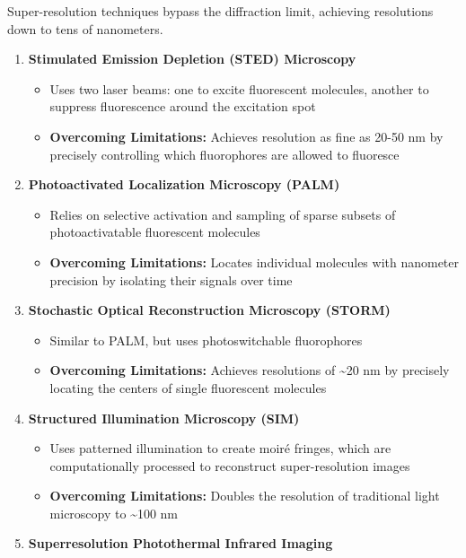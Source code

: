 \documentclass[
  a4paper,
]{book}
\providecommand{\tightlist}{%
  \setlength{\itemsep}{0pt}\setlength{\parskip}{0pt}}
\begin{document}
\begin{tcolorbox}
Super-resolution techniques bypass the diffraction limit, achieving
resolutions down to tens of nanometers.

\begin{enumerate}
\def\labelenumi{\arabic{enumi}.}
\tightlist
\item
  \textbf{Stimulated Emission Depletion (STED) Microscopy}

  \begin{itemize}
  \tightlist
  \item
    Uses two laser beams: one to excite fluorescent molecules, another
    to suppress fluorescence around the excitation spot
  \item
    \textbf{Overcoming Limitations:} Achieves resolution as fine as
    20-50 nm by precisely controlling which fluorophores are allowed to
    fluoresce
  \end{itemize}
\item
  \textbf{Photoactivated Localization Microscopy (PALM)}

  \begin{itemize}
  \tightlist
  \item
    Relies on selective activation and sampling of sparse subsets of
    photoactivatable fluorescent molecules
  \item
    \textbf{Overcoming Limitations:} Locates individual molecules with
    nanometer precision by isolating their signals over time
  \end{itemize}
\item
  \textbf{Stochastic Optical Reconstruction Microscopy (STORM)}

  \begin{itemize}
  \tightlist
  \item
    Similar to PALM, but uses photoswitchable fluorophores
  \item
    \textbf{Overcoming Limitations:} Achieves resolutions of
    \textasciitilde20 nm by precisely locating the centers of single
    fluorescent molecules
  \end{itemize}
\item
  \textbf{Structured Illumination Microscopy (SIM)}

  \begin{itemize}
  \tightlist
  \item
    Uses patterned illumination to create moiré fringes, which are
    computationally processed to reconstruct super-resolution images
  \item
    \textbf{Overcoming Limitations:} Doubles the resolution of
    traditional light microscopy to \textasciitilde100 nm
  \end{itemize}
\item
  \textbf{Superresolution Photothermal Infrared Imaging}


\end{enumerate}
\end{tcolorbox}
\end{document}
